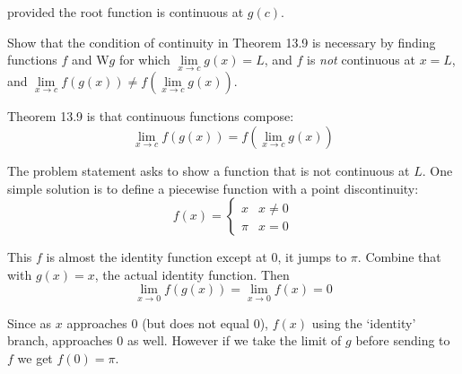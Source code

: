 \documentclass{article}
\begin{document}
provided the root function is continuous at $g(c)$.

\begin{problem}
Show that the condition of continuity in Theorem 13.9 is necessary by finding functions $f$ and W$g$ for which $\lim\limits_{x\to c}g(x) = L$, and $f$ is \textit{not} continuous at $x = L$, and $\lim\limits_{x \to c} f(g(x)) \neq f\left(\lim\limits_{x \to c} g(x)\right)$.
\end{problem}

Theorem 13.9 is that continuous functions compose:
$$\lim_{x \to c} f(g(x)) = f\left(\lim_{x \to c} g(x)\right)$$

The problem statement asks to show a function that is not continuous at $L$. One simple solution is to define a piecewise function with a point discontinuity:
$$f(x) = \begin{cases} x & x \neq 0 \\ \pi & x = 0 \end{cases}$$

This $f$ is almost the identity function except at 0, it jumps to $\pi$. Combine that with $g(x) = x$, the actual identity function. Then
$$\lim_{x \to 0} f(g(x)) = \lim_{x \to 0} f(x) = 0$$

Since as $x$ approaches 0 (but does not equal 0), $f(x)$ using the `identity' branch, approaches 0 as well. However if we take the limit of $g$ before sending to $f$ we get $f(0) = \pi$.
\end{document}
